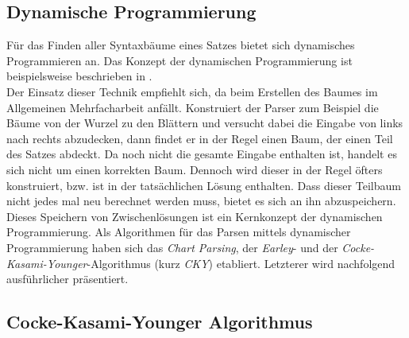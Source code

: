 \subsection{Dynamische Programmierung}
\label{sec:nlp:syn-parsen:dyn-progr}

Für das Finden aller Syntaxbäume eines Satzes bietet sich dynamisches Programmieren an. Das Konzept der dynamischen Programmierung ist beispielsweise beschrieben in \cite{dynamischeprog}. \\
Der Einsatz dieser Technik empfiehlt sich, da beim Erstellen des Baumes im Allgemeinen Mehrfacharbeit anfällt. Konstruiert der Parser zum Beispiel die Bäume von der Wurzel zu den Blättern und versucht dabei die Eingabe von links nach rechts abzudecken, dann findet er in der Regel einen Baum, der einen Teil des Satzes abdeckt. Da noch nicht die gesamte Eingabe enthalten ist, handelt es sich nicht um einen korrekten Baum. Dennoch wird dieser in der Regel öfters konstruiert, bzw. ist in der tatsächlichen Lösung enthalten. Dass dieser Teilbaum nicht jedes mal neu berechnet werden muss, bietet es sich an ihn abzuspeichern. Dieses Speichern von Zwischenlösungen ist ein Kernkonzept der dynamischen Programmierung. Als Algorithmen für das Parsen mittels dynamischer Programmierung haben sich das \textit{Chart Parsing}, der \textit{Earley}- und der \textit{Cocke-Kasami-Younger}-Algorithmus (kurz \textit{CKY}) etabliert. Letzterer wird nachfolgend ausführlicher präsentiert. \cite[Kapitel 11]{nlpGrundlagen}

\subsection{Cocke-Kasami-Younger Algorithmus}
\label{sec:nlp:syn-parsen:cky}

